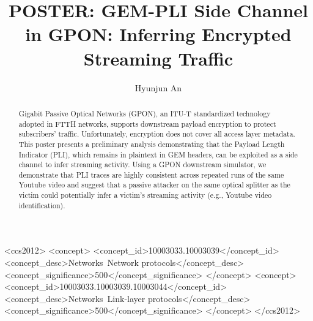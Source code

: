 \documentclass[sigconf]{acmart}
\begin{document}
\title{POSTER: GEM-PLI Side Channel in GPON: Inferring Encrypted Streaming Traffic}

%
%
\author{Hyunjun An}
\renewcommand{\shortauthors}{Hyunjun An}


\begin{abstract}
Gigabit Passive Optical Networks (GPON), an ITU-T standardized technology adopted in FTTH networks, supports downstream payload encryption to protect subscribers' traffic. Unfortunately, encryption does not cover all access layer metadata. This poster presents a preliminary analysis demonstrating that the Payload Length Indicator (PLI), which remains in plaintext in GEM headers, can be exploited as a side channel to infer streaming activity. Using a GPON downstream simulator, we demonstrate that PLI traces are highly consistent across repeated runs of the same Youtube video and suggest that a passive attacker on the same optical splitter as the victim could potentially infer a victim's streaming activity (e.g., Youtube video identification).
\end{abstract}


\begin{CCSXML}
<ccs2012>
   <concept>
       <concept_id>10003033.10003039</concept_id>
       <concept_desc>Networks~Network protocols</concept_desc>
       <concept_significance>500</concept_significance>
       </concept>
   <concept>
       <concept_id>10003033.10003039.10003044</concept_id>
       <concept_desc>Networks~Link-layer protocols</concept_desc>
       <concept_significance>500</concept_significance>
       </concept>
 </ccs2012>
\end{CCSXML}



\end{document}
